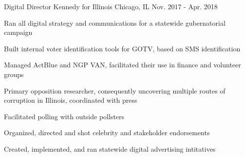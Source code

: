 

\begin{cventries}

  \cventry
    {Digital Director} %
    {Kennedy for Illinois} %
    {Chicago, IL} %
    {Nov. 2017 - Apr. 2018} %
    {
      \begin{cvitems} %
      	\item {Ran all digital strategy and communications for a statewide gubernatorial campaign}
      	\item {Built internal voter identification tools for GOTV, based on SMS identification}
      	\item {Managed ActBlue and NGP VAN, facilitated their use in finance and volunteer groups}
      	\item {Primary opposition researcher, consequently uncovering multiple routes of corruption in Illinois, coordinated with press}
      	\item {Facilitated polling with outside pollsters}
      	\item {Organized, directed and shot celebrity and stakeholder endorsements}
      	\item {Created, implemented, and ran statewide digital advertising intitatives}
      \end{cvitems}
    }


\end{cventries}
